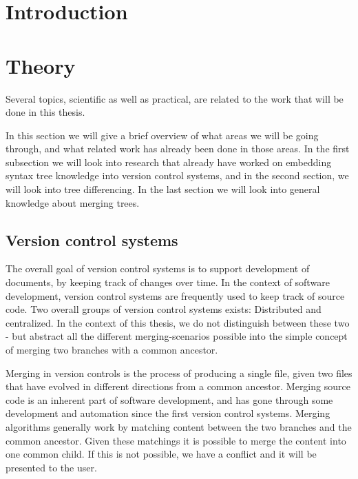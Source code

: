 \documentclass[11pt]{article}
\author{
        Kasper Videbæk \\
}
\date{\today}
\begin{document}
\maketitle

\tableofcontents

\clearpage 
\section{Introduction}

\clearpage 
\section{Theory}
Several topics, scientific as well as practical, are related to the work that will be done in this thesis.

In this section we will give a brief overview of what areas we will be going through, and what related work has already been done in those areas. In the first subsection we will look into research that already have worked on embedding syntax tree knowledge into version control systems, and in the second section, we will look into tree differencing. In the last section we will look into general knowledge about merging trees.

\subsection{Version control systems}
The overall goal of version control systems is to support development of documents, by keeping track of changes over time. In the context of software development, version control systems are frequently used to keep track of source code. Two overall groups of version control systems exists: Distributed and centralized. In the context of this thesis, we do not distinguish between these two - but abstract all the different merging-scenarios possible into the simple concept of merging two branches with a common ancestor.

Merging in version controls is the process of producing a single file, given two files that have evolved in different directions from a common ancestor. Merging source code is an inherent part of software development, and has gone through some development and automation since the first version control systems. Merging algorithms generally work by matching content between the two branches and the common ancestor. Given these matchings it is possible to merge the content into one common child. If this is not possible, we have a conflict and it will be presented to the user.
\end{document}
